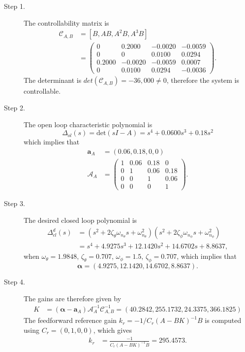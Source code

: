 \begin{description}
\item[Step 1.] 
The controllability matrix is 
\begin{align*}
\mathcal{C}_{A,B} &= [B, AB, A^2B, A^3B] \\
 	&= \begin{pmatrix}           
        0  &  0.2000  & -0.0020  & -0.0059 \\
         0 &        0 &   0.0100 &   0.0294 \\
    0.2000 &  -0.0020 &  -0.0059 &   0.0007 \\
         0 &   0.0100 &   0.0294 &  -0.0036 \end{pmatrix}.
\end{align*}
The determinant is $det(\mathcal{C}_{A,B})=-36,000\neq 0$, therefore the system is controllable.  
\item[Step 2.] The open loop characteristic polynomial is
\[
\Delta_{ol}(s)=\text{det}(sI-A) = s^4 + 0.0600 s^3 + 0.18 s^2 
\]
which implies that
\begin{align*}
\mathbf{a}_A &= (0.06, 0.18, 0, 0) \\
\mathcal{A}_A &= \begin{pmatrix} 
1 & 0.06 & 0.18 & 0 \\ 0 & 1 & 0.06 & 0.18 \\ 0 & 0 & 1 & 0.06 \\ 0 & 0 & 0 & 1
\end{pmatrix}.
\end{align*}

\item[Step 3.] The desired closed loop polynomial is
\begin{align*}
\Delta_{cl}^d(s) &= (s^2+2\zeta_{\theta}\omega_{n_\theta} s + \omega_{n_\theta}^2)(s^2+2\zeta_{\phi}\omega_{n_\phi} s + \omega_{n_\phi}^2) \\
&=s^4 + 4.9275 s^3 + 12.1420 s^2 + 14.6702 s + 8.8637,              
\end{align*}
when $\omega_\theta = 1.9848$, $\zeta_\theta = 0.707$, $\omega_\phi=1.5$, $\zeta_\phi = 0.707$, 
which implies that
\[
\boldsymbol{\alpha} = (4.9275,   12.1420,   14.6702,    8.8637).
\]

\item[Step 4.]
The gains are therefore given by
\begin{align*}
K &= (\boldsymbol{\alpha}-\mathbf{a}_A)\mathcal{A}_A^{-1}\mathcal{C}_{A,B}^{-1} 
  = (40.2842,  255.1732,   24.3375,  366.1825)
\end{align*}
The feedforward reference gain $k_r=-1/C_r(A-BK)^{-1}B$ is computed using $C_r=(0,1,0,0)$, which gives
\begin{align*}
k_r &= \frac{-1}{C_r(A-BK)^{-1}B} 
    = 295.4573.
\end{align*}
\end{description}

